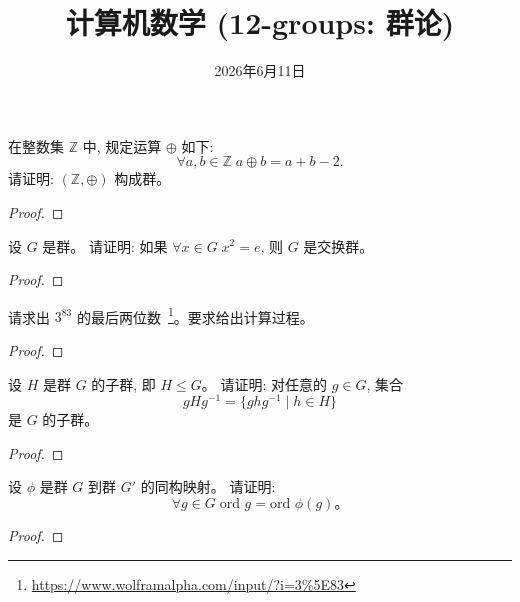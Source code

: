 \documentclass[a4paper, justified]{tufte-handout}
\title{计算机数学 (12-groups: 群论)}
\date{2026年6月11日}
\begin{document}
\maketitle
\noplagiarism %
\begin{abstract}
\end{abstract}
\beginrequired

\begin{problem}
  在整数集 $\mathbb{Z}$ 中, 规定运算 $\oplus$ 如下:
  \[
    \forall a, b \in \mathbb{Z}\; a \oplus b = a + b - 2.
  \]
  请证明: $(\mathbb{Z}, \oplus)$ 构成群。
\end{problem}

\begin{proof}
\end{proof}

\begin{problem}
  设 $G$ 是群。
  请证明: 如果 $\forall x \in G\; x^2 = e$,
  则 $G$ 是交换群。
\end{problem}

\begin{proof}
\end{proof}

\begin{problem}
  请求出 $3^{83}$ 的最后两位数~\footnote{\url{https://www.wolframalpha.com/input/?i=3\%5E83}}。要求给出计算过程。
\end{problem}

\begin{proof}
\end{proof}

\begin{problem}
  设 $H$ 是群 $G$ 的子群, 即 $H \le G$。
  请证明: 对任意的 $g \in G$, 集合
  \[
    gHg^{-1} = \{ghg^{-1} \mid h \in H\}
  \]
  是 $G$ 的子群。
\end{problem}

\begin{proof}
\end{proof}

\begin{problem}
  设 $\phi$ 是群 $G$ 到群 $G'$ 的同构映射。
  请证明:
  \[
    \forall g \in G\; \text{ord } g = \text{ord } \phi(g)\text{。}
  \]
\end{problem}

\begin{proof}
\end{proof}
\end{document}
